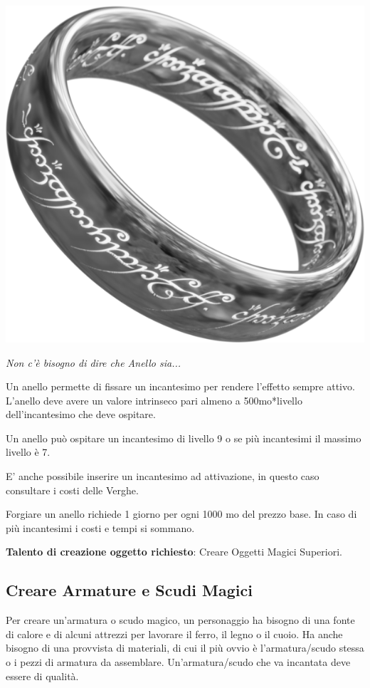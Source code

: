 \begin{multicols}{2}
\begin{center}
\includegraphics[width=0.5\linewidth]{immagini/onering2.png}

\textit{Non c'è bisogno di dire che Anello sia...}
\end{center}

Un anello permette di fissare un incantesimo per rendere l'effetto sempre attivo.
L'anello deve avere un valore intrinseco pari almeno a 500mo*livello dell'incantesimo che deve ospitare.

Un anello può ospitare un incantesimo di livello 9 o se più incantesimi il massimo livello è 7.

E' anche possibile inserire un incantesimo ad attivazione, in questo caso consultare i costi delle Verghe.

Forgiare un anello richiede 1 giorno per ogni 1000 mo del prezzo base. In caso di più incantesimi i costi e tempi si sommano.

\medskip

\textbf{Talento di creazione oggetto richiesto}: Creare Oggetti Magici Superiori.

\subsection{Creare Armature e Scudi Magici}

Per creare un'armatura o scudo magico, un personaggio ha bisogno di una fonte di calore e di alcuni attrezzi per lavorare il ferro, il legno o il cuoio. Ha anche bisogno di una provvista di materiali, di cui il più ovvio è l'armatura/scudo stessa o i pezzi di armatura da assemblare. Un'armatura/scudo che va incantata deve essere di qualità.


\end{multicols}
